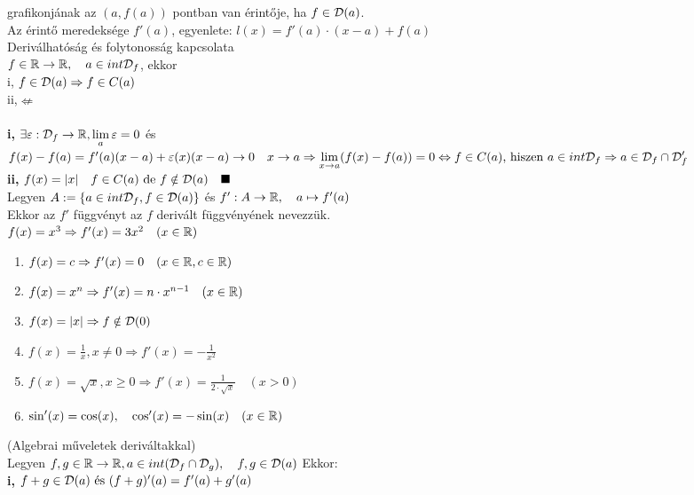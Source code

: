 \documentclass[a4paper,11pt]{article}
\begin{document}
grafikonjának az $(a,f(a))$ pontban van érintője, ha $f\in\mathcal{D}(a)$.\\[0.1cm]Az érintő 
meredeksége $f'(a)$, egyenlete: $l(x)=f'(a)\cdot(x-a)+f(a)$\\[0.3cm]\tetel 
Deriválhatóság és folytonosság kapcsolata\\[0.1cm]$f\in\mathbb{R}\to\mathbb{R},\quad a\in int\mathcal{D}_f$, 
ekkor\\[0.2cm] \hspace*{1cm} i, $f\in\mathcal{D}(a)\Rightarrow f\in C(a)$\\[0.1cm]
\hspace*{1cm} ii,\hspace{1.6cm}$\nLeftarrow$\\[0.2cm]\biz\\[0.2cm]\textbf{i,} 
$\exists\varepsilon: \mathcal{D}_f\to\mathbb{R},\displaystyle\lim_{a}\varepsilon=0$ és $f(x)-f(a)=f'(a)(x-a)
+\varepsilon(x)(x-a)\to0\quad x\to a\\[0.1cm]\Rightarrow\displaystyle\lim_{x\to a}(f(x)-f(a))=0
\Leftrightarrow f\in C(a)\text{, hiszen } a\in int\mathcal{D}_f\Rightarrow a\in\mathcal{D}_f
\cap\mathcal{D}_f'$\\[0.2cm]\textbf{ii,} $f(x)=|x|\quad f\in C(a)\text{ de } 
f\notin\mathcal{D}(a)\quad\blacksquare$\\[0.2cm] Legyen $A:=\{a\in int\mathcal{D}_f,f\in\mathcal{D}(a)\}$ és 
$f':A\to\mathbb{R},\quad a\mapsto f'(a)$\\[0.1cm]Ekkor az $f'$ függvényt az $f$ derivált 
függvényének nevezzük.\\[0.2cm]\pl $f(x)=x^3\Rightarrow f'(x)=3x^2\quad(x\in\mathbb{R})$
\begin{enumerate}
	\item $f(x)=c\Rightarrow f'(x)=0\quad (x\in\mathbb{R},c\in\mathbb{R})$
	\item $f(x)=x^n\Rightarrow f'(x)=n\cdot x^{n-1}\quad (x\in\mathbb{R})$
	\item $f(x)=|x|\Rightarrow f\notin\mathcal{D}(0)$
	\item $f(x)=\frac{1}{x},x\neq0\Rightarrow f'(x)=-\frac{1}{x^2}$
	\item $f(x)=\sqrt{x},x\geq0\Rightarrow f'(x)=\frac{1}{2\cdot\sqrt{x}}\quad(x>0)$
	\item $\sin'(x)=\cos(x),\quad\cos'(x)=-\sin(x)\quad(x\in\mathbb{R})$
\end{enumerate}
\newpage
\tetel (Algebrai műveletek deriváltakkal)\\[0.1cm]Legyen $f,g\in\mathbb{R}\to\mathbb{R},a\in 
int(\mathcal{D}_f\cap\mathcal{D}_g),\quad f,g\in\mathcal{D}(a)$ Ekkor:\\[0.2cm]\hspace*{0.7cm}\textbf{i,} $f+g\in\mathcal{D}(a)\text{ és }(f+g)'(a)=f'(a)+g'(a)$\\[0.1cm]\hspace*{0.7cm}
\end{document}
